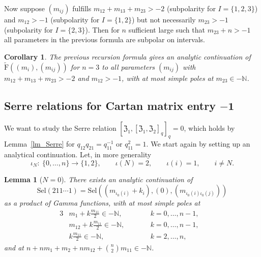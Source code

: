 \documentclass[10pt,a4paper]{amsart}
\numberwithin{equation}{section}
\newtheorem{cor}[teo]{Corollary}
\newtheorem{lem}[teo]{Lemma}
\newcommand{\N}{\mathbb{N}}
\newcommand{\zem}{\mathfrak{Z}}
\newcommand{\Sel}{\mathrm{Sel}}
\newcommand{\rFp}{\tilde{\mathrm{F}}}
\begin{document}
Now suppose $(m_{ij})$ fulfills $m_{12}+m_{13}+m_{23}>-2$ (subpolarity for $I=\{1,2,3\}$) and $m_{12}>-1$ (subpolarity for $I=\{1,2\}$) but not necessarily $m_{23}>-1$ (subpolarity for $I=\{2,3\}$). Then for $n$ sufficient large such that $m_{23}+n>-1$ all parameters in the previous formula are subpolar on intervals.

\begin{cor}\label{cor_RecursionContinuation3} The previous recursion formula gives an analytic continuation of $\rFp((m_i){,}(m_{ij}))$ for $n=3$ to all parameters $(m_{ij})$ with $m_{12}+m_{13}+m_{23}>-2$ and $m_{12}>-1$, with at most simple poles at $m_{23}\in-\N$.
\end{cor}

\subsection[Serre relations for Cartan matrix entry $-1$]{Serre relations for Cartan matrix entry $\boldsymbol{-1}$}\label{sec_Serre}

We want to study the Serre relation $[\zem_1,[\zem_1,\zem_2]_q]_q=0$, which holds by Lemma~\ref{lm_Serre} for $q_{12}q_{21}=q_{11}^{-1}$ or $q_{11}^2=1$. We start again by setting up an analytical continuation. Let, in more generality
\[\iota_N\colon \ \{0,\dots,n\}\to \{1,2\},\qquad
\iota(N)=2,\qquad \iota(i)=1, \qquad i\neq N.\]

\begin{lem}[$N=0$] There exists an analytic continuation of
\[\Sel(211\cdots 1)=\Sel((m_{\iota_0(i)}+k_i),(0), (m_{\iota_0(i)\iota_0(j)}))\]
as a product of Gamma functions, with at most simple poles at
	\begin{alignat*}{3}
		& m_1+ k \frac{m_{11}}{2}  \in -\N, \qquad && k=0,\dots,n-1,& \\
		& m_{12}+k\frac{m_{11}}{2}  \in -\N,  \qquad&&  k=0,\dots,n-1, & \\
		& k\frac{m_{11}}{2}  \in -\N,  \qquad && k=2,\dots,n, &
		\end{alignat*}
	and at $n+ nm_1+m_2 + nm_{12} + {n\choose 2} m_{11} \in -\N$.
\end{lem}
	
\end{document}
